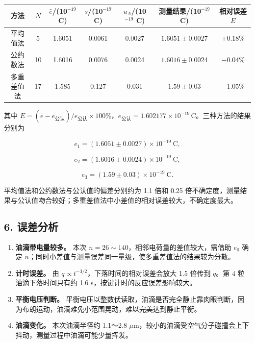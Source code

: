 \begin{center}\small\setlength{\tabcolsep}{4pt}
\begin{tabular}{ccccccc}
\toprule
方法 & $N$ & $\bar e$/(10$^{-19}$ C) & $s$/(10$^{-19}$ C) & $u_A$/(10$^{-19}$ C) & 测量结果/(10$^{-19}$ C) & 相对误差 $E$ \\
\midrule
平均值法 & 5 & 1.6051 & 0.0061 & 0.0027 & $1.6051\pm0.0027$ & +0.18\% \\
公约数法 & 10 & 1.6016 & 0.0076 & 0.0024 & $1.6016\pm0.0024$ & −0.04\% \\
多重差值法 & 17 & 1.585 & 0.127 & 0.031 & $1.59\pm0.03$ & −1.05\% \\
\bottomrule\end{tabular}\end{center}

其中 $E=(\bar e-e_{\text{公认}})/e_{\text{公认}}\times100\%$，$e_{\text{公认}}=1.602177\times10^{-19}\,\mathrm{C}$。三种方法的结果分别为

\[
e_1=(1.6051\pm0.0027)\times10^{-19}\ \mathrm{C},
\]

\[
e_2=(1.6016\pm0.0024)\times10^{-19}\ \mathrm{C},
\]

\[
e_3=(1.59\pm0.03)\times10^{-19}\ \mathrm{C}.
\]

平均值法和公约数法与公认值的偏差分别约为 1.1 倍和 0.25 倍不确定度，测量结果与公认值吻合较好；多重差值法中小差值的相对误差较大，不确定度最大。

\subsection*{6. 误差分析}

\begin{enumerate}
\item \textbf{油滴带电量较多。} 本次 $n=26\sim140$，相邻电荷量的差值较大，需借助 $e_0$ 确定 $n$；同时小差值与测量误差同一量级，使多重差值法的结果较为分散。
\item \textbf{计时误差。} 由 $q\propto t^{-3/2}$，下落时间的相对误差会放大 1.5 倍传到 $q$。第 4 粒油滴下落时间只有约 1.6 s，按键计时的反应误差影响较大。
\item \textbf{平衡电压判断。} 平衡电压以整数伏读取，油滴是否完全静止靠肉眼判断，因为布朗运动，油滴难免小范围晃动，难以完美达到静止平衡。
\item \textbf{油滴变化。} 本次油滴半径约 1.1～2.8 $\mu$m，较小的油滴受空气分子碰撞会上下抖动，测量过程中油滴可能少量挥发。

\end{enumerate}
